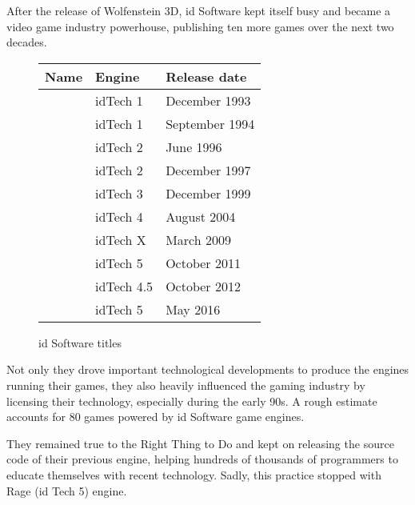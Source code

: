 After the release of Wolfenstein 3D, id Software kept itself busy and became a video game industry powerhouse, publishing ten more games over the next two decades. 
 \begin{figure}[H]
\centering  
\begin{tabularx}{\textwidth}{ X  Y Y }
  \toprule
  \textbf{Name} & \textbf{Engine}  & \textbf{Release date} \\
  \toprule {}\protect\footnotemark & idTech 1 & December 1993 \\ 
            & idTech 1 & September 1994 \\ 
            & idTech 2 &June 1996 \\ 
            & idTech 2 & December 1997 \\ 
            &  idTech 3 & December 1999 \\ 
            &  idTech 4 & August 2004 \\ 
            &  idTech X & March 2009 \\ 
            &  idTech 5 & October 2011 \\ 
            &  idTech 4.5 & October 2012 \\ 
            &  idTech 5 & May 2016 \\ 
  \toprule
\end{tabularx}
\caption{id Software titles}\label{fig:vga_history}
\end{figure}
\par
Not only they drove important technological developments to produce the engines running their games, they also heavily influenced the gaming industry by licensing their technology, especially during the early 90s. A rough estimate accounts for 80 games powered by id Software game engines.\\
\par
They remained true to the Right Thing to Do and kept on releasing the source code of their previous engine, helping hundreds of thousands of programmers to educate themselves with recent technology. Sadly, this practice stopped with Rage (id Tech 5) engine.
\par
